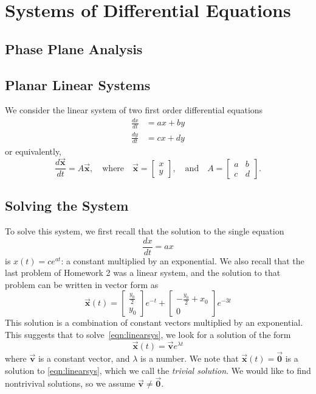 \documentclass{book}
\newcommand{\BV}{\vec{\textbf{v}}}
\newcommand{\BX}{\vec{\textbf{x}}}
\newcommand{\BZ}{\vec{\textbf{0}}}  %
\begin{document}
\section{Systems of Differential Equations}
\subsection{Phase Plane Analysis}
\subsection{Planar Linear Systems}


We consider the linear system of two first order
differential equations
\begin{equation}
\begin{split}
  \frac{dx}{dt} & = ax + by \\
  \frac{dy}{dt} & = cx + dy
\end{split}
\end{equation}
or equivalently,
\begin{equation}
  \frac{d\BX}{dt} = A\BX, \quad \textrm{where} \quad
     \BX = \begin{bmatrix} x \\ y \end{bmatrix},
     \quad \textrm{and} \quad
     A = \begin{bmatrix} a & b \\ c & d \end{bmatrix}.
\label{eqn:linearsys}
\end{equation}

\subsection*{Solving the System}
To solve this system, we first recall that the solution to the
single equation
\begin{equation}
  \frac{dx}{dt} = a x
\end{equation}
is $x(t) = c e^{at}$: a constant multiplied by
an exponential.  We also recall that the last problem of Homework 2
was a linear system, and the solution to that problem can be
written in vector form as
\begin{equation}
 \BX(t) = \begin{bmatrix} \frac{y_0}{2} \\ y_0 \end{bmatrix} e^{-t}
            +\begin{bmatrix} -\frac{y_0}{2}+x_0 \\ 0 \end{bmatrix} e^{-3t}
\end{equation}
This solution is a combination of constant vectors
multiplied by an exponential.
This suggests that to solve~\eqref{eqn:linearsys},
we look for a solution of the form
\begin{equation}
  \BX(t) = \BV e^{\lambda t}
\end{equation}
where $\BV$ is a constant vector, and $\lambda$ is a number.
We note that $\BX(t) = \BZ$ is a solution to \eqref{eqn:linearsys},
which we call the \emph{trivial solution}.
We would like to
find nontrivival solutions, so we assume $\BV\ne \BZ$.
\end{document}
